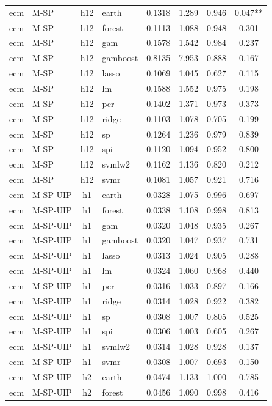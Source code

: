 \begin{ThreePartTable}
\begin{longtable}[t]{llclcccc}
\addlinespace
ecm & M-SP & h12 & earth & 0.1318 & 1.289 & 0.946 & 0.047**\\
ecm & M-SP & h12 & forest & 0.1113 & 1.088 & 0.948 & 0.301\\
ecm & M-SP & h12 & gam & 0.1578 & 1.542 & 0.984 & 0.237\\
ecm & M-SP & h12 & gamboost & 0.8135 & 7.953 & 0.888 & 0.167\\
ecm & M-SP & h12 & lasso & 0.1069 & 1.045 & 0.627 & 0.115\\
ecm & M-SP & h12 & lm & 0.1588 & 1.552 & 0.975 & 0.198\\
ecm & M-SP & h12 & pcr & 0.1402 & 1.371 & 0.973 & 0.373\\
ecm & M-SP & h12 & ridge & 0.1103 & 1.078 & 0.705 & 0.199\\
ecm & M-SP & h12 & sp & 0.1264 & 1.236 & 0.979 & 0.839\\
ecm & M-SP & h12 & spi & 0.1120 & 1.094 & 0.952 & 0.800\\
ecm & M-SP & h12 & svmlw2 & 0.1162 & 1.136 & 0.820 & 0.212\\
ecm & M-SP & h12 & svmr & 0.1081 & 1.057 & 0.921 & 0.716\\
\addlinespace
ecm & M-SP-UIP & h1 & earth & 0.0328 & 1.075 & 0.996 & 0.697\\
ecm & M-SP-UIP & h1 & forest & 0.0338 & 1.108 & 0.998 & 0.813\\
ecm & M-SP-UIP & h1 & gam & 0.0320 & 1.048 & 0.935 & 0.267\\
ecm & M-SP-UIP & h1 & gamboost & 0.0320 & 1.047 & 0.937 & 0.731\\
ecm & M-SP-UIP & h1 & lasso & 0.0313 & 1.024 & 0.905 & 0.288\\
ecm & M-SP-UIP & h1 & lm & 0.0324 & 1.060 & 0.968 & 0.440\\
ecm & M-SP-UIP & h1 & pcr & 0.0316 & 1.033 & 0.897 & 0.166\\
ecm & M-SP-UIP & h1 & ridge & 0.0314 & 1.028 & 0.922 & 0.382\\
ecm & M-SP-UIP & h1 & sp & 0.0308 & 1.007 & 0.805 & 0.525\\
ecm & M-SP-UIP & h1 & spi & 0.0306 & 1.003 & 0.605 & 0.267\\
ecm & M-SP-UIP & h1 & svmlw2 & 0.0314 & 1.028 & 0.928 & 0.137\\
ecm & M-SP-UIP & h1 & svmr & 0.0308 & 1.007 & 0.693 & 0.150\\
\addlinespace
ecm & M-SP-UIP & h2 & earth & 0.0474 & 1.133 & 1.000 & 0.785\\
ecm & M-SP-UIP & h2 & forest & 0.0456 & 1.090 & 0.998 & 0.416\\

\end{longtable}
\end{ThreePartTable}
